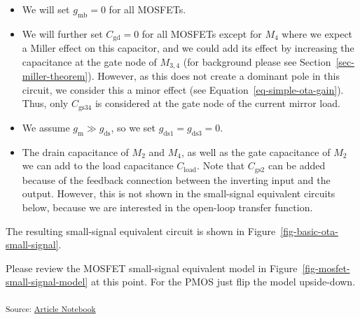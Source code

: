 \documentclass[
  a4paper,
  DIV=11,
  numbers=noendperiod]{scrartcl}
\providecommand{\tightlist}{%
  \setlength{\itemsep}{0pt}\setlength{\parskip}{0pt}}\usepackage{longtable,booktabs,array}
\begin{document}
\begin{itemize}
\tightlist
\item
  We will set \(g_\mathrm{mb}= 0\) for all MOSFETs.
\item
  We will further set \(C_\mathrm{gd}= 0\) for all MOSFETs except for
  \(M_4\) where we expect a Miller effect on this capacitor, and we
  could add its effect by increasing the capacitance at the gate node of
  \(M_{3,4}\) (for background please see
  Section~\ref{sec-miller-theorem}). However, as this does not create a
  dominant pole in this circuit, we consider this a minor effect (see
  Equation~\ref{eq-simple-ota-gain}). Thus, only \(C_\mathrm{gs34}\) is
  considered at the gate node of the current mirror load.
\item
  We assume \(g_\mathrm{m}\gg g_\mathrm{ds}\), so we set
  \(g_\mathrm{ds1} = g_\mathrm{ds3} = 0\).
\item
  The drain capacitance of \(M_2\) and \(M_4\), as well as the gate
  capacitance of \(M_2\) we can add to the load capacitance
  \(C_\mathrm{load}\). Note that \(C_\mathrm{gs2}\) can be added because
  of the feedback connection between the inverting input and the output.
  However, this is not shown in the small-signal equivalent circuits
  below, because we are interested in the open-loop transfer function.
\end{itemize}

The resulting small-signal equivalent circuit is shown in
Figure~\ref{fig-basic-ota-small-signal}.

\begin{tcolorbox}[enhanced jigsaw, titlerule=0mm, left=2mm, coltitle=black, toprule=.15mm, breakable, opacitybacktitle=0.6, colframe=quarto-callout-warning-color-frame, bottomtitle=1mm, toptitle=1mm, opacityback=0, colbacktitle=quarto-callout-warning-color!10!white, title=\textcolor{quarto-callout-warning-color}{\faExclamationTriangle}\hspace{0.5em}{Refresh MOSFET Small-Signal Model}, arc=.35mm, rightrule=.15mm, colback=white, bottomrule=.15mm, leftrule=.75mm]

Please review the MOSFET small-signal equivalent model in
Figure~\ref{fig-mosfet-small-signal-model} at this point. For the PMOS
just flip the model upside-down.

\end{tcolorbox}

\textsubscript{Source:
\href{https://iic-jku.github.io/analog-circuit-design/index.qmd.html}{Article
Notebook}}
\end{document}

